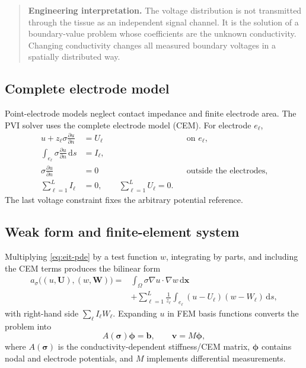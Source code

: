 \documentclass[11pt]{article}
\newcommand{\sig}{\bm{\sigma}}
\newcommand{\plain}[1]{%
  \begin{quote}\color{blue!45!black}\textbf{Engineering interpretation.} #1\end{quote}}
\begin{document}
\plain{The voltage distribution is not transmitted through the tissue as an
independent signal channel.  It is the solution of a boundary-value problem whose
coefficients are the unknown conductivity.  Changing conductivity changes all
measured boundary voltages in a spatially distributed way.}

\subsection{Complete electrode model}

Point-electrode models neglect contact impedance and finite electrode area.  The
PVI solver uses the complete electrode model (CEM).  For electrode $e_\ell$,
\begin{subequations}\label{eq:cem}
\begin{align}
  u + z_\ell\sigma\frac{\partial u}{\partial n} &= U_\ell
      &&\text{on }e_\ell,\\
  \int_{e_\ell}\sigma\frac{\partial u}{\partial n}\,\mathrm ds &= I_\ell,\\
  \sigma\frac{\partial u}{\partial n} &=0
      &&\text{outside the electrodes},\\
  \sum_{\ell=1}^{L} I_\ell &=0,
  \qquad \sum_{\ell=1}^{L} U_\ell=0.
\end{align}
\end{subequations}
The last voltage constraint fixes the arbitrary potential reference.

\subsection{Weak form and finite-element system}

Multiplying \cref{eq:eit-pde} by a test function $w$, integrating by parts, and
including the CEM terms produces the bilinear form
\begin{equation}
\begin{split}
  a_\sigma\big((u,\bm U),(w,\bm W)\big)
  =&\int_\Omega \sigma\nabla u\cdot\nabla w\,\mathrm d\bm x\\
  &+\sum_{\ell=1}^{L}\frac{1}{z_\ell}
  \int_{e_\ell}(u-U_\ell)(w-W_\ell)\,\mathrm ds,
\end{split}
\end{equation}
with right-hand side $\sum_\ell I_\ell W_\ell$.  Expanding $u$ in FEM basis
functions converts the problem into
\begin{equation}
  A(\sig)\bm\phi=\bm b,
  \qquad \bm v=M\bm\phi,
  \label{eq:fem-forward}
\end{equation}
where $A(\sig)$ is the conductivity-dependent stiffness/CEM matrix, $\bm\phi$
contains nodal and electrode potentials, and $M$ implements differential
measurements.
\end{document}
